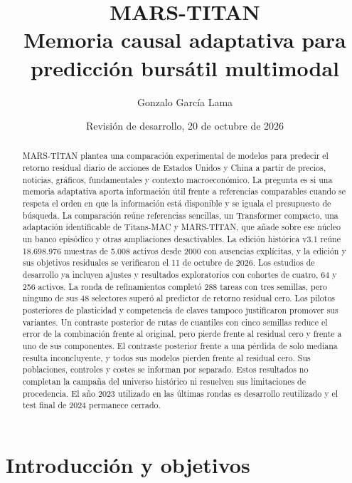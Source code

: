 \documentclass[11pt,a4paper]{report}
\title{MARS-TITAN\\\large Memoria causal adaptativa para predicción bursátil multimodal}
\author{Gonzalo García Lama}
\date{Revisión de desarrollo, 20 de octubre de 2026}
\begin{document}
\maketitle
\begin{abstract}
MARS-TITAN plantea una comparación experimental de modelos para predecir el
retorno residual diario de acciones de Estados Unidos y China a partir de
precios, noticias, gráficos, fundamentales y contexto macroeconómico. La
pregunta es si una memoria adaptativa aporta información útil frente a
referencias comparables cuando se respeta el orden en que la información está
disponible y se iguala el presupuesto de búsqueda. La comparación reúne
referencias sencillas, un Transformer compacto, una adaptación identificable
de Titans-MAC y MARS-TITAN, que añade sobre ese núcleo un banco episódico y
otras ampliaciones desactivables. La edición histórica v3.1 reúne 18.698.976
muestras de 5.008 activos desde 2000 con ausencias explícitas, y la edición y
sus objetivos residuales se verificaron el 11 de octubre de 2026. Los estudios
de desarrollo ya incluyen ajustes y resultados exploratorios con cohortes de
cuatro, 64 y 256 activos. La ronda de refinamientos completó 288 tareas con
tres semillas, pero ninguno de sus 48 selectores superó al predictor de retorno
residual cero. Los pilotos posteriores de plasticidad y competencia de claves
tampoco justificaron promover sus variantes. Un contraste posterior de rutas
de cuantiles con cinco semillas reduce el error de la combinación frente al
original, pero pierde frente al residual cero y frente a uno de sus
componentes. El contraste posterior frente a una pérdida de solo mediana
resulta inconcluyente, y todos sus modelos pierden frente al residual cero.
Sus poblaciones, controles y costes se informan por separado.
Estos resultados no completan la campaña del
universo histórico ni resuelven sus limitaciones de procedencia. El año 2023
utilizado en las últimas rondas es desarrollo reutilizado y el test final de
2024 permanece cerrado.
\end{abstract}
\tableofcontents

\chapter{Introducción y objetivos}
\end{document}
